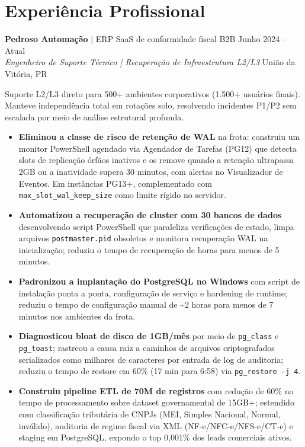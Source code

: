 \documentclass[11pt,a4paper]{article}
\begin{document}
\section{Experiência Profissional}

\textbf{Pedroso Automação} | ERP SaaS de conformidade fiscal B2B \hfill Junho 2024 -- Atual \\
\textit{Engenheiro de Suporte Técnico | Recuperação de Infraestrutura L2/L3} \hfill União da Vitória, PR

Suporte L2/L3 direto para 500+ ambientes corporativos (1.500+ usuários finais). Manteve independência total em rotações solo, resolvendo incidentes P1/P2 sem escalada por meio de análise estrutural profunda.
\begin{itemize}[topsep=4pt]
    \item \textbf{Eliminou a classe de risco de retenção de WAL} na frota: construiu um monitor PowerShell agendado via Agendador de Tarefas (PG12) que detecta slots de replicação órfãos inativos e os remove quando a retenção ultrapassa 2GB ou a inatividade supera 30 minutos, com alertas no Visualizador de Eventos. Em instâncias PG13+, complementado com \texttt{max\_slot\_wal\_keep\_size} como limite rígido no servidor.
    \item \textbf{Automatizou a recuperação de cluster com 30 bancos de dados} desenvolvendo script PowerShell que paraleliza verificações de estado, limpa arquivos \texttt{postmaster.pid} obsoletos e monitora recuperação WAL na inicialização; reduziu o tempo de recuperação de horas para menos de 5 minutos.
    \item \textbf{Padronizou a implantação do PostgreSQL no Windows} com script de instalação ponta a ponta, configuração de serviço e hardening de runtime; reduziu o tempo de configuração manual de \textasciitilde{}2 horas para menos de 7 minutos nos ambientes da frota.
    \item \textbf{Diagnosticou bloat de disco de 1GB/mês} por meio de \texttt{pg\_class} e \texttt{pg\_toast}; rastreou a causa raiz a caminhos de arquivos criptografados serializados como milhares de caracteres por entrada de log de auditoria; reduziu o tempo de restore em 60\% (17 min para 6:58) via \texttt{pg\_restore -j 4}.
    \item \textbf{Construiu pipeline ETL de 70M de registros} com redução de 60\% no tempo de processamento sobre dataset governamental de 15GB+; estendido com classificação tributária de CNPJs (MEI, Simples Nacional, Normal, inválido), auditoria de regime fiscal via XML (NF-e/NFC-e/NFS-e/CT-e) e staging em PostgreSQL, expondo o top 0,001\% dos leads comerciais ativos.

\end{itemize}
\end{document}
